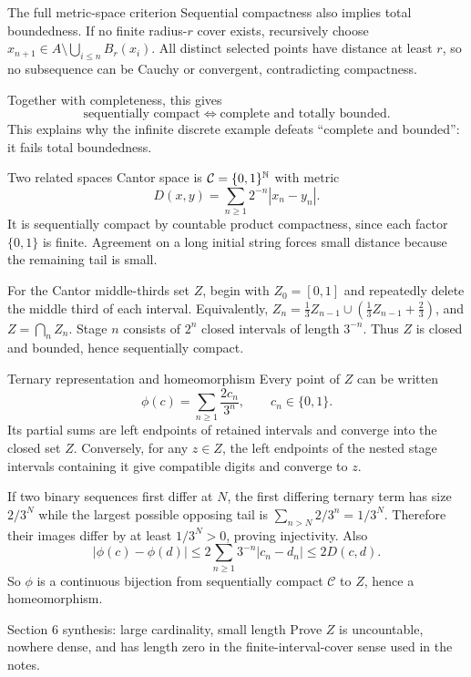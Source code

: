 \begin{note}{The full metric-space criterion}
Sequential compactness also implies total boundedness. If no finite radius-$r$ cover exists, recursively choose $x_{n+1}\in A\setminus\bigcup_{i\le n}B_r(x_i)$. All distinct selected points have distance at least $r$, so no subsequence can be Cauchy or convergent, contradicting compactness.

Together with completeness, this gives
\[\text{sequentially compact}\iff\text{complete and totally bounded}.\]
This explains why the infinite discrete example defeats ``complete and bounded'': it fails total boundedness.
\end{note}


\begin{note}{Two related spaces}
Cantor space is $\mathcal C=\{0,1\}^{\mathbb N}$ with metric
\[D(x,y)=\sum_{n\ge1}2^{-n}|x_n-y_n|.\]
It is sequentially compact by countable product compactness, since each factor $\{0,1\}$ is finite. Agreement on a long initial string forces small distance because the remaining tail is small.

For the Cantor middle-thirds set $Z$, begin with $Z_0=[0,1]$ and repeatedly delete the middle third of each interval. Equivalently, $Z_n=\frac13Z_{n-1}\cup(\frac13Z_{n-1}+\frac23)$, and $Z=\bigcap_nZ_n$. Stage $n$ consists of $2^n$ closed intervals of length $3^{-n}$. Thus $Z$ is closed and bounded, hence sequentially compact.
\end{note}
\begin{note}{Ternary representation and homeomorphism}
Every point of $Z$ can be written
\[\phi(c)=\sum_{n\ge1}\frac{2c_n}{3^n},\qquad c_n\in\{0,1\}.\]
Its partial sums are left endpoints of retained intervals and converge into the closed set $Z$. Conversely, for any $z\in Z$, the left endpoints of the nested stage intervals containing it give compatible digits and converge to $z$.

If two binary sequences first differ at $N$, the first differing ternary term has size $2/3^N$ while the largest possible opposing tail is $\sum_{n>N}2/3^n=1/3^N$. Therefore their images differ by at least $1/3^N>0$, proving injectivity. Also
\[|\phi(c)-\phi(d)|\le2\sum_{n\ge1}3^{-n}|c_n-d_n|\le2D(c,d).\]
So $\phi$ is a continuous bijection from sequentially compact $\mathcal C$ to $Z$, hence a homeomorphism.
\end{note}
\begin{exam}{Section 6 synthesis: large cardinality, small length}
Prove $Z$ is uncountable, nowhere dense, and has length zero in the finite-interval-cover sense used in the notes.
\end{exam}
